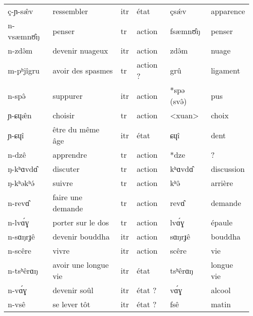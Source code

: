 \documentclass[11pt, a4paper]{book}              %
\newcommand{\ipa}[1]{{\phon \mbox{#1}}} %
\begin{document}
\begin{table} [H]
{\begin{tabular}{llllll}
\ipa{ç-ɲ-sæ̂v}   & ressembler           & itr          & état            & \ipa{çsǽv}                & apparence  \\
\ipa{n-vsæmnʊ̂ŋ} & penser               & tr           & action          & \ipa{fsæmnʊ̂ŋ}             & penser     \\
\ipa{n-zdə̂m}    & devenir nuageux      & itr          & action          & \ipa{zdə̂m}                & nuage      \\
\ipa{m-pʰjîgru} & avoir des spasmes    & tr           & action ?        & \ipa{grû}                 & ligament   \\
\ipa{n-spə̂}     & suppurer             & itr          & action          & \ipa{*spə} (\ipa{svə̂})  & pus        \\
\ipa{ɲ-ɕɥæ̂n}    & choisir              & tr           & action          & <xuan>    & choix      \\
\ipa{ɲ-ɕɥî}     & être du même âge     & itr          & état            & \ipa{ɕɥî}                 & dent       \\
\ipa{n-dzê}     & apprendre            & tr           & action          & \ipa{*dze}                 & ?          \\
\ipa{ŋ-kʰɑvdɑ̂}  & discuter             & tr           & action          & \ipa{kʰɑvdɑ̂}              & discussion \\
\ipa{ŋ-kʰəkʰə́}  & suivre               & tr           & action          & \ipa{kʰə̂}                 &  arrière           \\
\ipa{n-revɑ̂}  & faire une demande              & tr           & action          & \ipa{revɑ̂}                 &  demande         \\
\ipa{n-lvɑ́ɣ}  & porter sur le dos             & tr           & action          & \ipa{lvɑ́ɣ}                 &  épaule         \\
\ipa{n-sɑŋrɟê}  & devenir bouddha            & itr           & action          & \ipa{sɑŋrɟê}                 &  bouddha        \\
\ipa{n-scêre}  & vivre          & itr           & action          & \ipa{scêre}                 &  vie        \\
\ipa{n-tsʰêrɑŋ}  & avoir une longue vie          & itr           & état          & \ipa{tsʰêrɑŋ}                 &  longue vie        \\
\ipa{n-vɑ́ɣ}  & devenir soûl          & itr           & état ?         & \ipa{vɑ́ɣ}                 &  alcool       \\
\ipa{n-vsê}  & se lever tôt          & itr           & état ?         & \ipa{fsê}                 &  matin       \\

\end{tabular}}
\end{table}
\end{document}
